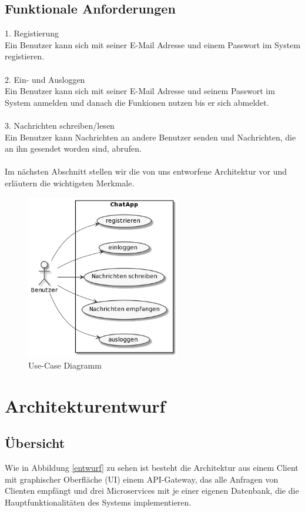 \subsection{Funktionale Anforderungen}
1. Registierung\\
Ein Benutzer kann sich mit seiner E-Mail Adresse und einem Passwort im System registieren.\\
\\
2. Ein- und Ausloggen\\
Ein Benutzer kann sich mit seiner E-Mail Adresse und seinem Passwort im System anmelden und danach die Funkionen nutzen bis er sich abmeldet.\\
\\
3. Nachrichten schreiben/lesen\\
Ein Benutzer kann Nachrichten an andere Benutzer senden und Nachrichten, die an ihn gesendet worden sind, abrufen.\\
\\
Im nächsten Abschnitt stellen wir die von uns entworfene Architektur vor und erläutern die wichtigsten Merkmale. 

\begin{figure}[bth] 
	\centering
	\includegraphics[width=0.6\textwidth]{Graphics/Usecase-Diagramm.png}
	\caption{Use-Case Diagramm}
\end{figure}

\section{Architekturentwurf}

\subsection{Übersicht}
Wie in Abbildung \ref{entwurf} zu sehen ist besteht die Architektur aus einem Client mit graphischer Oberfläche (UI) einem API-Gateway, das alle Anfragen von Clienten empfängt und drei Microservices mit je einer eigenen Datenbank, die die Hauptfunktionalitäten des Systems implementieren.


